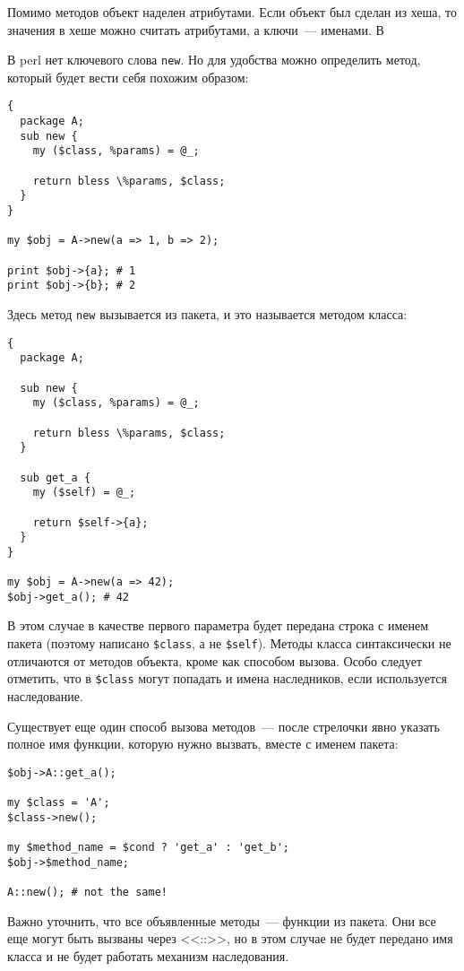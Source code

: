 Помимо методов объект наделен атрибутами. Если объект был сделан из хеша, то значения в хеше можно считать атрибутами, а ключи~--- именами. В

В perl нет ключевого слова \verb|new|. Но для удобства можно определить метод, который будет вести себя похожим образом:
\begin{verbatim}
{
  package A;
  sub new {
    my ($class, %params) = @_;

    return bless \%params, $class;
  }
}

my $obj = A->new(a => 1, b => 2);

print $obj->{a}; # 1
print $obj->{b}; # 2
\end{verbatim}
Здесь метод \verb|new| вызывается из пакета, и это называется методом класса:
\begin{verbatim}
{
  package A;

  sub new {
    my ($class, %params) = @_;

    return bless \%params, $class;
  }

  sub get_a {
    my ($self) = @_;

    return $self->{a};
  }
}

my $obj = A->new(a => 42);
$obj->get_a(); # 42
\end{verbatim}
В этом случае в качестве первого параметра будет передана строка с именем пакета (поэтому написано \verb|$class|, а не \verb|$self|). Методы класса синтаксически не отличаются от методов объекта, кроме как способом вызова. Особо следует отметить, что в \verb|$class| могут попадать и имена наследников, если используется наследование.

Существует еще один способ вызова методов~--- после стрелочки явно указать полное имя функции, которую нужно вызвать, вместе с именем пакета:
\begin{verbatim}
$obj->A::get_a();

my $class = 'A';
$class->new();

my $method_name = $cond ? 'get_a' : 'get_b';
$obj->$method_name;

A::new(); # not the same!
\end{verbatim}
Важно уточнить, что все объявленные методы~--- функции из пакета. Они все еще могут быть вызваны через <<::>>, но в этом случае не будет передано имя класса и не будет работать механизм наследования.


